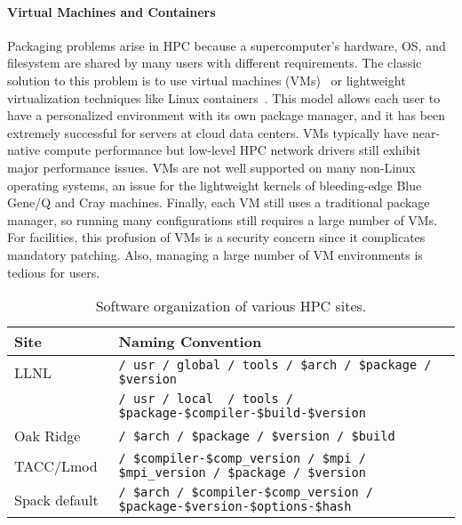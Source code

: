 \paragraph{Virtual Machines and Containers}

Packaging problems arise in HPC because a supercomputer's hardware, OS, and
filesystem are shared by many users with different requirements.  The classic
solution to this problem is to use virtual
machines (VMs)~\cite{barham2003xen,rosenblum1999vmware,smith2005architecture}
or lightweight virtualization techniques like Linux
containers~\cite{felter2014updated,merkel2014docker}. This model allows each
 user to have a personalized environment with its own package manager, and it
has been extremely successful for servers at cloud data centers. VMs typically
have near-native compute performance but low-level HPC network drivers still
exhibit major performance issues. VMs are not well supported on many
non-Linux operating systems, an issue for the lightweight
kernels of bleeding-edge Blue Gene/Q and Cray machines.
Finally, each VM still uses a traditional package manager,
so running many configurations still requires a large number of VMs.
For facilities, this profusion of VMs is a security concern since it 
complicates mandatory patching. Also, managing  a large number of VM 
environments is tedious for users.

\begin{table*}\centering
\begin{tabular}{|l|l|}
\hline
Site           & Naming Convention \\
\hline
\hline
LLNL       & {\tt / usr / global / tools / \$arch / \$package / \$version} \\
           & {\tt / usr / local~ / tools / \$package-\$compiler-\$build-\$version } \\
\hline
Oak Ridge~\cite{jones+:cug08}  & {\tt / \$arch / \$package / \$version / \$build} \\
\hline
TACC/Lmod~\cite{mclay:lmod-tutorial}& {\tt / \$compiler-\$comp\_version / \$mpi / \$mpi\_version / \$package / \$version} \\
\hline
\hline
Spack default                  & {\tt / \$arch / \$compiler-\$comp\_version / \$package-\$version-\$options-\$hash} \\
\hline
\end{tabular}
\caption{
	Software organization of various HPC sites.
	\label{tab:naming-conventions}
}
\end{table*}

